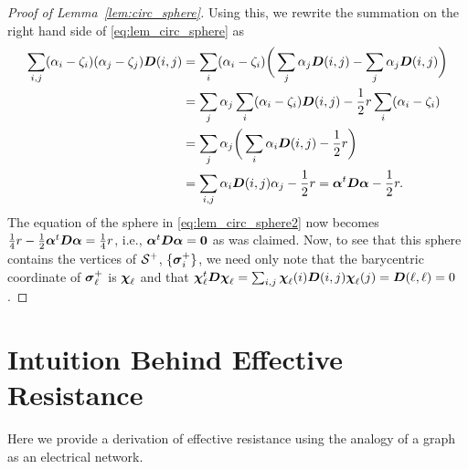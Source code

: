 \begin{proof}[Proof of Lemma~\ref{lem:circ_sphere}]
	Using this, we rewrite the summation on the right hand side of \eqref{eq:lem_circ_sphere} as 
	\begin{align*}
	\sum_{i,j}(\alpha_i-\zeta_i)(\alpha_j-\zeta_j)\vb*{D}(i,j) &= \sum_i (\alpha_i-\zeta_i) \bigg(\sum_j\alpha_j \vb*{D}(i,j) - \sum_j \alpha_j \vb*{D}(i,j)\bigg) \\
	&= \sum_j\alpha_j \sum_i (\alpha_i-\zeta_i)\vb*{D}(i,j) - \frac{1}{2}r \sum_i (\alpha_i-\zeta_i) \\
	&= \sum_j \alpha_j \bigg(\sum_i \alpha_i \vb*{D}(i,j) - \frac{1}{2}r \bigg) \\
	&= \sum_{i,j} \alpha_i \vb*{D}(i,j) \alpha_j -\frac{1}{2}r= \vb*{\alpha}^t \vb*{D}\vb*{\alpha} - \frac{1}{2}r.
	\end{align*}
	The equation of the sphere in \eqref{eq:lem_circ_sphere2} now becomes $\frac{1}{4}r - \frac{1}{2}\vb*{\alpha}^t \vb*{D}\vb*{\alpha} = \frac{1}{4}r$, i.e., $\vb*{\alpha}^t \vb*{D}\vb*{\alpha}=\vb{0}$ as was claimed.  Now, to see that this sphere contains the vertices of $\mathcal{S}^+$,  $\{\vb*{\sigma}_i^+\}$, we need only note that the barycentric coordinate of $\vb*{\sigma}_\ell^+$ is $\boldsymbol{\chi}_\ell$ and that $\boldsymbol{\chi}_\ell^t \vb*{D} \boldsymbol{\chi}_\ell = \sum_{i,j} \boldsymbol{\chi}_\ell(i) \vb*{D}(i,j) \boldsymbol{\chi}_\ell(j) = \vb*{D}(\ell,\ell) = 0$. 
\end{proof}







\chapter{Intuition Behind Effective Resistance}
\label{sec:app_er}

Here we provide a derivation of effective resistance using the analogy of a graph as an electrical network. 

